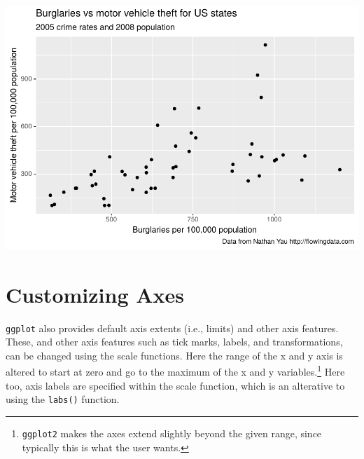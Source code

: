 \documentclass[
]{krantz}
\makeatletter
\newenvironment{Shaded}{\begin{snugshade}}{\end{snugshade}}
\newcommand{\DataTypeTok}[1]{\textcolor[rgb]{0.27,0.27,0.27}{#1}}
\newcommand{\DecValTok}[1]{\textcolor[rgb]{0.06,0.06,0.06}{#1}}
\newcommand{\KeywordTok}[1]{\textcolor[rgb]{0.27,0.27,0.27}{\textbf{#1}}}
\newcommand{\NormalTok}[1]{#1}
\newcommand{\OperatorTok}[1]{\textcolor[rgb]{0.43,0.43,0.43}{\textbf{#1}}}
\newcommand{\StringTok}[1]{\textcolor[rgb]{0.5,0.5,0.5}{#1}}
\newenvironment{kframe}{%
\medskip{}
\setlength{\fboxsep}{.8em}
 \def\at@end@of@kframe{}%
 \ifinner\ifhmode%
  \def\at@end@of@kframe{\end{minipage}}%
  \begin{minipage}{\columnwidth}%
 \fi\fi%
 \def\FrameCommand##1{\hskip\@totalleftmargin \hskip-\fboxsep
 \colorbox{shadecolor}{##1}\hskip-\fboxsep
     \hskip-\linewidth \hskip-\@totalleftmargin \hskip\columnwidth}%
 \MakeFramed {\advance\hsize-\width
   \@totalleftmargin\z@ \linewidth\hsize
   \@setminipage}}%
 {\par\unskip\endMakeFramed%
 \at@end@of@kframe}
\renewenvironment{Shaded}{\begin{kframe}}{\end{kframe}}
\makeatother
\begin{document}
\includegraphics{bookdown_files/figure-latex/unnamed-chunk-68-1.pdf}

\hypertarget{customizing-axes}{%
\section{Customizing Axes}\label{customizing-axes}}

\texttt{ggplot} also provides default axis extents (i.e., limits) and other axis features. These, and other axis features such as tick marks, labels, and transformations, can be changed using the scale functions. Here the range of the x and y axis is altered to start at zero and go to the maximum of the x and y variables.\footnote{\texttt{ggplot2} makes the axes extend slightly beyond the given range, since typically this is what the user wants.} Here too, axis labels are specified within the scale function, which is an alterative to using the \texttt{labs()} function.

\begin{Shaded}
\end{Shaded}
\end{document}

